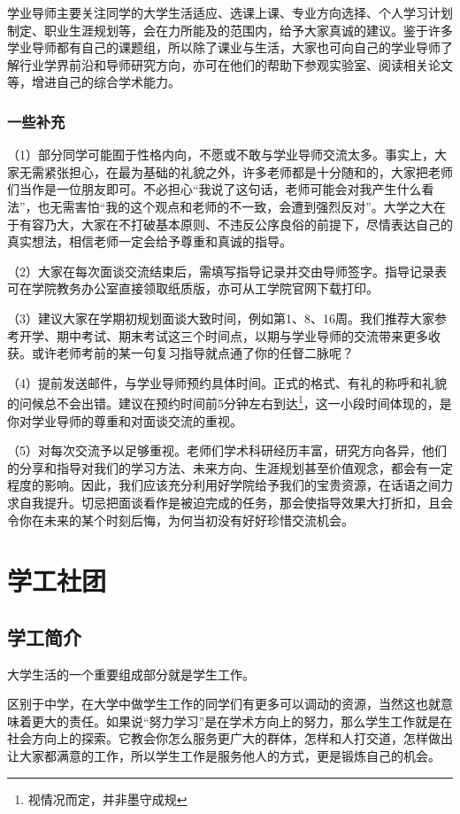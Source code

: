\documentclass[11pt,oneside]{book}
\begin{document}
学业导师主要关注同学的大学生活适应、选课上课、专业方向选择、个人学习计划制定、职业生涯规划等，会在力所能及的范围内，给予大家真诚的建议。鉴于许多学业导师都有自己的课题组，所以除了课业与生活，大家也可向自己的学业导师了解行业学界前沿和导师研究方向，亦可在他们的帮助下参观实验室、阅读相关论文等，增进自己的综合学术能力。

\subsection{一些补充}

（1）部分同学可能囿于性格内向，不愿或不敢与学业导师交流太多。事实上，大家无需紧张担心，在最为基础的礼貌之外，许多老师都是十分随和的，大家把老师们当作是一位朋友即可。不必担心“我说了这句话，老师可能会对我产生什么看法”，也无需害怕“我的这个观点和老师的不一致，会遭到强烈反对”。大学之大在于有容乃大，大家在不打破基本原则、不违反公序良俗的前提下，尽情表达自己的真实想法，相信老师一定会给予尊重和真诚的指导。

（2）大家在每次面谈交流结束后，需填写指导记录并交由导师签字。指导记录表可在学院教务办公室直接领取纸质版，亦可从工学院官网下载打印。

（3）建议大家在学期初规划面谈大致时间，例如第1、8、16周。我们推荐大家参考开学、期中考试、期末考试这三个时间点，以期与学业导师的交流带来更多收获。或许老师考前的某一句复习指导就点通了你的任督二脉呢？

（4）提前发送邮件，与学业导师预约具体时间。正式的格式、有礼的称呼和礼貌的问候总不会出错。建议在预约时间前5分钟左右到达\footnote{视情况而定，并非墨守成规}，这一小段时间体现的，是你对学业导师的尊重和对面谈交流的重视。

（5）对每次交流予以足够重视。老师们学术科研经历丰富，研究方向各异，他们的分享和指导对我们的学习方法、未来方向、生涯规划甚至价值观念，都会有一定程度的影响。因此，我们应该充分利用好学院给予我们的宝贵资源，在话语之间力求自我提升。切忌把面谈看作是被迫完成的任务，那会使指导效果大打折扣，且会令你在未来的某个时刻后悔，为何当初没有好好珍惜交流机会。


\chapter{学工社团}
    \section{学工简介}
大学生活的一个重要组成部分就是学生工作。

区别于中学，在大学中做学生工作的同学们有更多可以调动的资源，当然这也就意味着更大的责任。如果说“努力学习”是在学术方向上的努力，那么学生工作就是在社会方向上的探索。它教会你怎么服务更广大的群体，怎样和人打交道，怎样做出让大家都满意的工作，所以学生工作是服务他人的方式，更是锻炼自己的机会。
\end{document}
